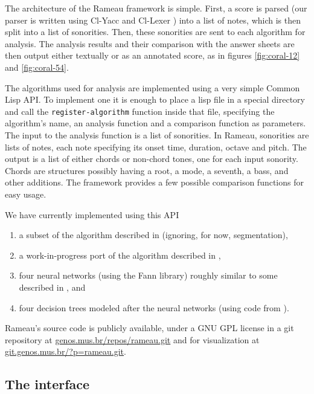 \documentclass{article}
\begin{document}
The architecture of the Rameau framework is simple. First, a score is
parsed (our parser is written using Cl-Yacc
\cite{chroboczek:cl-yacc} and Cl-Lexer
\cite{parker:lexer}) into a list of notes, which is then split
into a list of sonorities. Then, these sonorities are sent to each
algorithm for analysis. The analysis results and their comparison with
the answer sheets are then output either textually or as an annotated
score, as in figures \ref{fig:coral-12} and \ref{fig:coral-54}.

The algorithms used for analysis are implemented using a very simple
Common Lisp API. To implement one it is enough to place a lisp file in
a special directory and call the \texttt{register-algorithm} function
inside that file, specifying the algorithm's name, an analysis
function and a comparison function as parameters. The input to the
analysis function is a list of sonorities. In Rameau, sonorities are
lists of notes, each note specifying its onset time, duration, octave
and pitch. The output is a list of either chords or non-chord tones,
one for each input sonority. Chords are structures possibly having a
root, a mode, a seventh, a bass, and other additions. The
framework provides a few possible comparison functions for easy
usage.

We have currently implemented using this API 
\begin{enumerate}
\item a subset of the algorithm described in \cite{pardo.ea:algorithms}
  (ignoring, for now, segmentation), 
\item a work-in-progress port of the algorithm described in
  \cite{temperley.ea:modeling}, 
\item four neural networks (using the Fann \cite{nissen:fann}
  library) roughly similar to some described in
  \cite{tsui:harmonic}, and
\item four decision trees modeled after the neural networks (using code
  from \cite{mitchell:machine}).
\end{enumerate}

Rameau's source code is publicly available, under a GNU GPL
\cite{fsf:gpl} license in a git \cite{baudis:git}
repository at \url{genos.mus.br/repos/rameau.git} and for
visualization at \url{git.genos.mus.br/?p=rameau.git}.

\subsection{The interface}
\label{sec:analysis-output}
\end{document}
